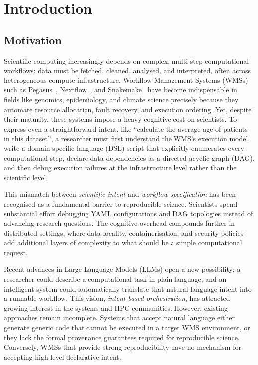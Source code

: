 \chapter{Introduction}\label{s:intro}

\section{Motivation}\label{s:motivation}

Scientific computing increasingly depends on complex, multi-step computational
workflows: data must be fetched, cleaned, analysed, and interpreted, often
across heterogeneous compute infrastructure. Workflow Management Systems (WMSs)
such as Pegasus~\cite{deelman2015pegasus}, Nextflow~\cite{di2017nextflow}, and
Snakemake~\cite{molder2021snakemake} have become indispensable in fields like
genomics, epidemiology, and climate science precisely because they automate
resource allocation, fault recovery, and execution ordering. Yet, despite their
maturity, these systems impose a heavy cognitive cost on scientists. To express
even a straightforward intent, like ``calculate the average age of patients in this
dataset'', a researcher must first understand the WMS's execution model,
write a domain-specific language (DSL) script that explicitly enumerates every
computational step, declare data dependencies as a directed acyclic graph (DAG),
and then debug execution failures at the infrastructure level rather than the
scientific level.

This mismatch between \emph{scientific intent} and \emph{workflow specification}
has been recognised as a fundamental barrier to reproducible science. Scientists
spend substantial effort debugging YAML configurations and DAG topologies instead
of advancing research questions. The cognitive overhead compounds further in
distributed settings, where data locality, containerisation, and security
policies add additional layers of complexity to what should be a simple
computational request.

Recent advances in Large Language Models (LLMs) open a new possibility: a
researcher could describe a computational task in plain language, and an
intelligent system could automatically translate that natural-language intent
into a runnable workflow. This vision, \emph{intent-based orchestration}, has
attracted growing interest in the systems and HPC communities. However, existing
approaches remain incomplete. Systems that accept natural language either
generate generic code that cannot be executed in a target WMS environment, or
they lack the formal provenance guarantees required for reproducible science.
Conversely, WMSs that provide strong reproducibility have no mechanism for
accepting high-level declarative intent.

